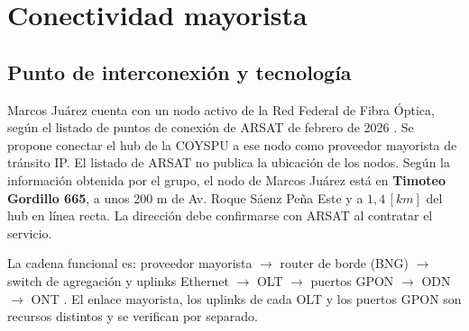 \section{Conectividad mayorista}
\label{sec:mayorista}

\subsection{Punto de interconexión y tecnología}
Marcos Juárez cuenta con un nodo activo de la Red Federal de Fibra Óptica, según el listado de puntos de conexión de ARSAT de febrero de 2026 \cite{arsat_nodos}. Se propone conectar el hub de la COYSPU a ese nodo como proveedor mayorista de tránsito IP. El listado de ARSAT no publica la ubicación de los nodos. Según la información obtenida por el grupo, el nodo de Marcos Juárez está en \textbf{Timoteo Gordillo 665}, a unos 200 m de Av. Roque Sáenz Peña Este y a $1{,}4 \, [km]$ del hub en línea recta. La dirección debe confirmarse con ARSAT al contratar el servicio.

La cadena funcional es: proveedor mayorista $\rightarrow$ router de borde (BNG) $\rightarrow$ switch de agregación y uplinks Ethernet $\rightarrow$ OLT $\rightarrow$ puertos GPON $\rightarrow$ ODN $\rightarrow$ ONT \cite{doc_backhaul}. El enlace mayorista, los uplinks de cada OLT y los puertos GPON son recursos distintos y se verifican por separado.

